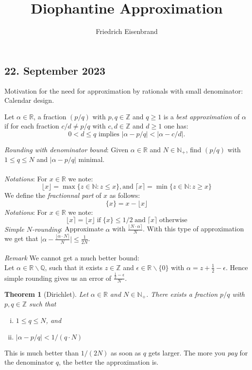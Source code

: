 \documentclass[a4paper,11pt,american]{article}
\title{Diophantine Approximation}
\author{Friedrich Eisenbrand}
\newcommand{\N}{\mathbb{N}}
\newcommand{\Q}{\mathbb{Q}}
\newcommand{\R}{\mathbb{R}}
\newcommand{\Z}{\mathbb{Z}}
\theoremstyle{plain}
\newtheorem{theorem}{Theorem}
\theoremstyle{definition}
\begin{document}
\maketitle



\subsection*{22. September 2023}

Motivation for the need for approximation by rationals with small denominator: Calendar design.

Let $\alpha\in\R$, a fraction $(p/q)$ with $p,q\in \Z$ and $q\geq 1$ is a \emph{best approximation} of $\alpha$ if for each fraction $c/d \neq p/q$  with $c,d \in\Z$ and $d\geq1$ one has:
\begin{displaymath}
  0 < d \leq q \text{ implies } \vert \alpha - p/q \vert < \vert\alpha - c/d \vert. 
\end{displaymath}

\emph{Rounding with denominator bound}: Given $\alpha\in\R$ and $N \in \N_+$, find $(p/q)$ with $1\leq q \leq N$ and  $\vert \alpha - p/q\vert $ minimal.\\\\
\emph{Notations}: For $x\in \R$ we note:
\begin{displaymath}
    \lfloor x\rfloor=\max\{z\in\N:z\leq x\},\text{and}\;
    \lceil x\rceil=\min\{z\in\N:z\geq x\}
\end{displaymath}
We define the \emph{fractionnal part} of $x$ as follows:
\begin{displaymath}
    \{x\}=x-\lfloor x\rfloor
\end{displaymath}
\emph{Notations}: For $x\in \R$ we note:
\begin{displaymath}
    \lfloor x\rceil=\lfloor x\rfloor\;\text{if}\; \{x\}\leq 1/2\; \text{and}\; \lceil x\rceil\; \text{otherwise}
\end{displaymath}
\emph{Simple $N$-rounding}: Approximate $\alpha$ with $\frac{ \lfloor N \cdot \alpha \rceil}{N}$. With this type of approximation we get that $\vert \alpha-\frac{\lfloor \alpha\cdot N\rceil}{N}\vert \leq\frac{1}{2N}$.\\\\
\emph{Remark} We cannot get a much better bound:\\
Let $\alpha\in \R\backslash\Q$, such that it exists $z\in \Z$ and $\epsilon\in\R\backslash\{0\}$ with $\alpha= z +\frac{1}{2}-\epsilon$. Hence simple rounding gives us an error of $\frac{\frac{1}{2}-\epsilon}{N}$.
\begin{theorem}[Dirichlet]
  \label{thr:1}
  Let  $\alpha\in \R$ and  $N \in \N_+$. There exists a fraction $p/q$ with $p,q\in\Z $ such that
  \begin{enumerate}[i)]
  \item $1 \leq q \leq N$, and
  \item $\vert \alpha - p/q\vert < 1/(q\cdot N)$ 
  \end{enumerate}
\end{theorem}
  This is much better than $1/(2N)$ as soon as $q$ gets larger. The more you \emph{pay} for the denominator $q$, the better the approximation is.
\end{document}
